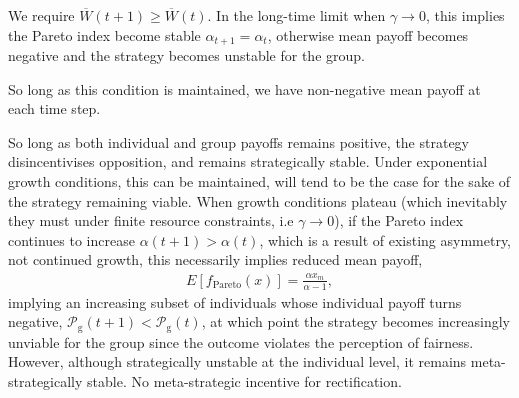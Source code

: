 \documentclass[twocolumn, aps, rmp, amsmath, amssymb, nofootinbib, superscriptaddress, longbibliography, floatfix, table-of-contents, eqsecnum]{revtex4-1}
\begin{document}
We require ${\overline W}(t+1)\geq {\overline W}(t)$. In the long-time limit when $\gamma\to 0$, this implies the Pareto index become stable $\alpha_{t+1} = \alpha_t$, otherwise mean payoff becomes negative and the strategy becomes unstable for the group.

So long as this condition is maintained, we have non-negative mean payoff at each time step.

So long as both individual and group payoffs remains positive, the strategy disincentivises opposition, and remains strategically stable. Under exponential growth conditions, this can be maintained, will tend to be the case for the sake of the strategy remaining viable. When growth conditions plateau (which inevitably they must under finite resource constraints, i.e $\gamma\to 0$), if the Pareto index continues to increase $\alpha(t+1)>\alpha(t)$, which is a result of existing asymmetry, not continued growth, this necessarily implies reduced mean payoff,
\begin{align}
	E[f_\text{Pareto}(x)] = \frac{\alpha x_m}{\alpha - 1},
\end{align}
implying an increasing subset of individuals whose individual payoff turns negative, $\mathcal{P}_\text{g}(t+1)<\mathcal{P}_\text{g}(t)$, at which point the strategy becomes increasingly unviable for the group since the outcome violates the perception of fairness. However, although strategically unstable at the individual level, it remains meta-strategically stable. No meta-strategic incentive for rectification.


\end{document}
